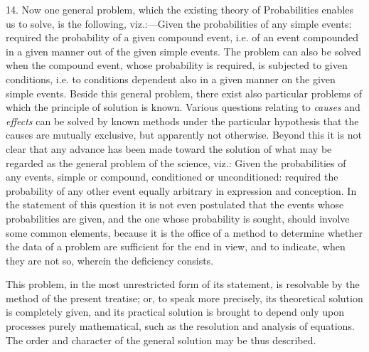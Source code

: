 \documentclass[oneside]{book}
\begin{document}
14. Now one general problem, which the existing theory of
Probabilities enables us to solve, is the following, viz.:---Given
the probabilities of any simple events: required the probability of
a given compound event, i.e. of an event compounded in a given
manner out of the given simple events. The problem can also
be solved when the compound event, whose probability is required,
is subjected to given conditions, i.e. to conditions dependent
also in a given manner on the given simple events.
Beside this general problem, there exist also particular problems
of which the principle of solution is known. Various questions
relating to \textit{causes} and \textit{effects} can be solved by known methods
under the particular hypothesis that the causes are mutually exclusive,
but apparently not otherwise. Beyond this it is not
clear that any advance has been made toward the solution of
what may be regarded as the general problem of the science, viz.:
Given the probabilities of any events, simple or compound, conditioned
or unconditioned: required the probability of any other
event equally arbitrary in expression and conception. In the
statement of this question it is not even postulated that the
events whose probabilities are given, and the one whose probability
is sought, should involve some common elements, because
it is the office of a method to determine whether the data of a
problem are sufficient for the end in view, and to indicate, when
they are not so, wherein the deficiency consists.

This problem, in the most unrestricted form of its statement,
is resolvable by the method of the present treatise; or, to speak
more precisely, its theoretical solution is completely given, and
its practical solution is brought to depend only upon processes
purely mathematical, such as the resolution and analysis of equations.
The order and character of the general solution may be
thus described.
\end{document}

